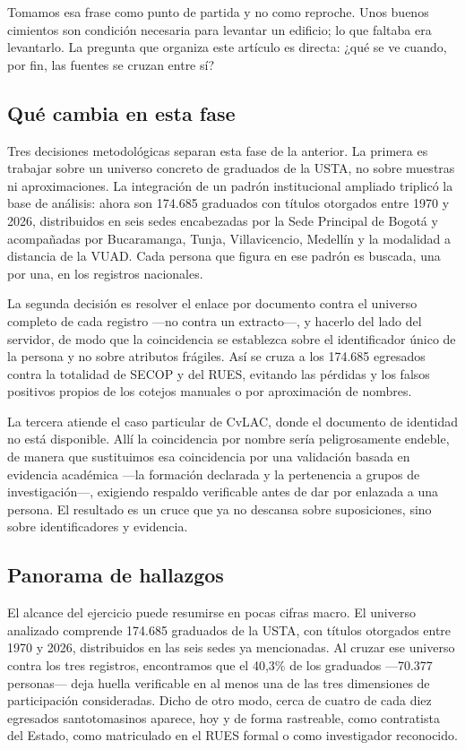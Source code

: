 Tomamos esa frase como punto de partida y no como reproche. Unos buenos cimientos son condición necesaria para levantar un edificio; lo que faltaba era levantarlo. La pregunta que organiza este artículo es directa: ¿qué se ve cuando, por fin, las fuentes se cruzan entre sí?

\subsection{Qué cambia en esta fase}

Tres decisiones metodológicas separan esta fase de la anterior. La primera es trabajar sobre un universo concreto de graduados de la USTA, no sobre muestras ni aproximaciones. La integración de un padrón institucional ampliado triplicó la base de análisis: ahora son 174.685 graduados con títulos otorgados entre 1970 y 2026, distribuidos en seis sedes encabezadas por la Sede Principal de Bogotá y acompañadas por Bucaramanga, Tunja, Villavicencio, Medellín y la modalidad a distancia de la VUAD. Cada persona que figura en ese padrón es buscada, una por una, en los registros nacionales.

La segunda decisión es resolver el enlace por documento contra el universo completo de cada registro —no contra un extracto—, y hacerlo del lado del servidor, de modo que la coincidencia se establezca sobre el identificador único de la persona y no sobre atributos frágiles. Así se cruza a los 174.685 egresados contra la totalidad de SECOP y del RUES, evitando las pérdidas y los falsos positivos propios de los cotejos manuales o por aproximación de nombres.

La tercera atiende el caso particular de CvLAC, donde el documento de identidad no está disponible. Allí la coincidencia por nombre sería peligrosamente endeble, de manera que sustituimos esa coincidencia por una validación basada en evidencia académica —la formación declarada y la pertenencia a grupos de investigación—, exigiendo respaldo verificable antes de dar por enlazada a una persona. El resultado es un cruce que ya no descansa sobre suposiciones, sino sobre identificadores y evidencia.

\subsection{Panorama de hallazgos}

El alcance del ejercicio puede resumirse en pocas cifras macro. El universo analizado comprende 174.685 graduados de la USTA, con títulos otorgados entre 1970 y 2026, distribuidos en las seis sedes ya mencionadas. Al cruzar ese universo contra los tres registros, encontramos que el 40,3\% de los graduados —70.377 personas— deja huella verificable en al menos una de las tres dimensiones de participación consideradas. Dicho de otro modo, cerca de cuatro de cada diez egresados santotomasinos aparece, hoy y de forma rastreable, como contratista del Estado, como matriculado en el RUES formal o como investigador reconocido.


